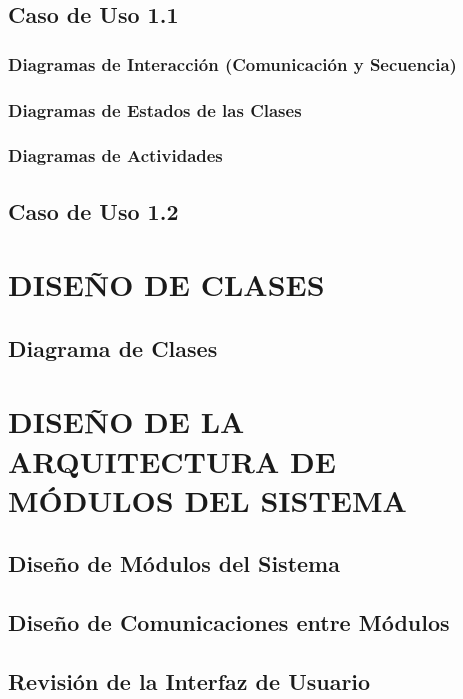 \documentclass[11pt]{report}
\begin{document}
\subsection{Caso de Uso 1.1} 

\subsubsection{Diagramas de Interacción (Comunicación y Secuencia)} 

\subsubsection{Diagramas de Estados de las Clases} 
 
\subsubsection{Diagramas de Actividades} 


\subsection{Caso de Uso 1.2}


\newpage
\section{DISEÑO DE CLASES}

\subsection{Diagrama de Clases}


\newpage
\section{DISEÑO DE LA ARQUITECTURA DE MÓDULOS DEL SISTEMA}

\subsection{Diseño de Módulos del Sistema}

\subsection{Diseño de Comunicaciones entre Módulos}

\subsection{Revisión de la Interfaz de Usuario}
\end{document}
